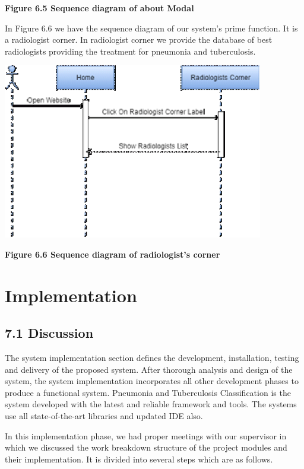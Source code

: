 \documentclass{article} %
\begin{document}
\noindent \textbf{Figure 6.5 Sequence diagram of about Modal}

\noindent In Figure 6.6 we have the sequence diagram of our system's prime function. It is a radiologist corner. In radiologist corner we provide the database of best radiologists providing the treatment for pneumonia and tuberculosis. 

\noindent \includegraphics*[width=4.49in, height=3.02in, keepaspectratio=false]{image33}

\noindent \textbf{Figure 6.6 Sequence diagram of radiologist's corner}

\noindent 

\noindent \eject 

\noindent 


\section{ Implementation}

\noindent 
\subsection{7.1 Discussion}

\noindent The system implementation section defines the development, installation, testing and delivery of the proposed system. After thorough analysis and design of the system, the system implementation incorporates all other development phases to produce a functional system. Pneumonia and Tuberculosis Classification is the system developed with the latest and reliable framework and tools. The systems use all state-of-the-art libraries and updated IDE also.

\noindent In this implementation phase, we had proper meetings with our supervisor in which we discussed the work breakdown structure of the project modules and their implementation. It is divided into several steps which are as follows.
\end{document}
